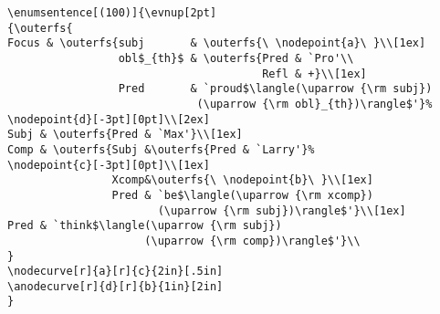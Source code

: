 \begin{verbatim}
\enumsentence[(100)]{\evnup[2pt]
{\outerfs{ 
Focus & \outerfs{subj       & \outerfs{\ \nodepoint{a}\ }\\[1ex]
                 obl$_{th}$ & \outerfs{Pred & `Pro'\\
                                       Refl & +}\\[1ex]
                 Pred       & `proud$\langle(\uparrow {\rm subj})
                             (\uparrow {\rm obl}_{th})\rangle$'}%
\nodepoint{d}[-3pt][0pt]\\[2ex]
Subj & \outerfs{Pred & `Max'}\\[1ex]
Comp & \outerfs{Subj &\outerfs{Pred & `Larry'}%
\nodepoint{c}[-3pt][0pt]\\[1ex]
                Xcomp&\outerfs{\ \nodepoint{b}\ }\\[1ex]
                Pred & `be$\langle(\uparrow {\rm xcomp})
                       (\uparrow {\rm subj})\rangle$'}\\[1ex]
Pred & `think$\langle(\uparrow {\rm subj})
                     (\uparrow {\rm comp})\rangle$'}\\
}
\nodecurve[r]{a}[r]{c}{2in}[.5in]
\anodecurve[r]{d}[r]{b}{1in}[2in]
}
\end{verbatim}
